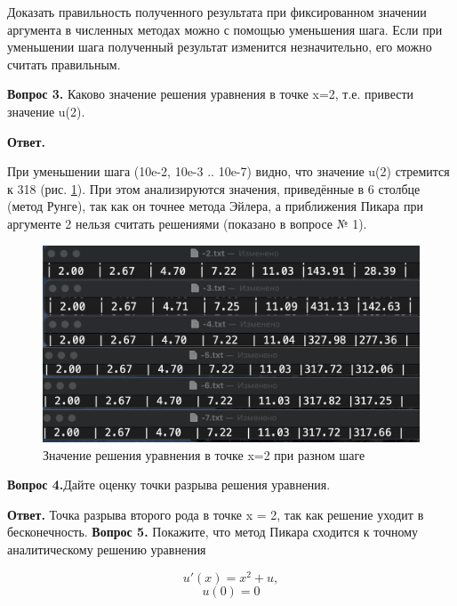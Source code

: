 \documentclass[12pt]{report}
\begin{document}
Доказать правильность полученного результата при фиксированном значении аргумента в численных методах можно с помощью уменьшения шага. Если при уменьшении шага полученный результат изменится незначительно, его можно считать правильным.

\textbf{Вопрос 3.}  Каково значение решения уравнения в точке x=2, т.е. привести значение u(2).
	
\textbf{Ответ.} 

При уменьшении шага (10e-2, 10e-3 .. 10e-7) видно, что значение u(2) стремится к 318 (рис. \ref{comp}). При этом анализируются значения, приведённые в 6 столбце (метод Рунге), так как он точнее метода Эйлера, а приближения Пикара при аргументе 2 нельзя считать решениями (показано в вопросе № 1). 

\begin{figure}[h!p]
	\centering
	\includegraphics[scale = 0.6]{comp.png}
	\caption{Значение решения уравнения в точке x=2 при разном шаге}
	\label{comp}
\end{figure}
\textbf{Вопрос 4.}Дайте оценку точки разрыва решения уравнения.

\textbf{Ответ.} 
Точка разрыва второго рода в точке x = 2, так как решение уходит в бесконечность.
\newpage
\textbf{Вопрос 5.} Покажите, что метод Пикара сходится к точному аналитическому решению уравнения

\begin{displaymath}
u'(x) = x^ 2 + u,
\end{displaymath}
\begin{displaymath}
u(0) = 0
\end{displaymath}
\end{document}
